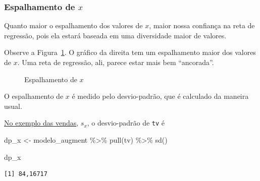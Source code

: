 \documentclass[
  letterpaper,
  DIV=11,
  numbers=noendperiod]{scrreprt}
\newenvironment{Shaded}{\begin{snugshade}}{\end{snugshade}}
\newcommand{\FunctionTok}[1]{\textcolor[rgb]{0.28,0.35,0.67}{#1}}
\newcommand{\NormalTok}[1]{\textcolor[rgb]{0.00,0.23,0.31}{#1}}
\newcommand{\OtherTok}[1]{\textcolor[rgb]{0.00,0.23,0.31}{#1}}
\newcommand{\SpecialCharTok}[1]{\textcolor[rgb]{0.37,0.37,0.37}{#1}}
\begin{document}
\subsubsection{\texorpdfstring{Espalhamento de
$x$}{Espalhamento de }}\label{espalhamento-de-x}

Quanto maior o espalhamento dos valores de $x$, maior nossa confiança na
reta de regressão, pois ela estará baseada em uma diversidade maior de
valores.

Observe a Figura~\ref{fig-spread-x}. O gráfico da direita tem um
espalhamento maior dos valores de $x$. Uma reta de regressão, ali,
parece estar mais bem ``ancorada''.

\begin{figure}[htb]


\caption{\label{fig-spread-x}Espalhamento de $x$}

\end{figure}%

O espalhamento de $x$ é medido pelo desvio-padrão, que é calculado da
maneira usual.

\hyperref[lm-vendas-tv]{No exemplo das vendas}, $s_x$, o desvio-padrão
de \texttt{tv} é

\begin{Shaded}
\begin{Highlighting}[]
\NormalTok{dp\_x }\OtherTok{\textless{}{-}}\NormalTok{ modelo\_augment }\SpecialCharTok{\%\textgreater{}\%} 
  \FunctionTok{pull}\NormalTok{(tv) }\SpecialCharTok{\%\textgreater{}\%} 
  \FunctionTok{sd}\NormalTok{()}

\NormalTok{dp\_x}
\end{Highlighting}
\end{Shaded}

\begin{verbatim}
[1] 84,16717
\end{verbatim}
\end{document}
